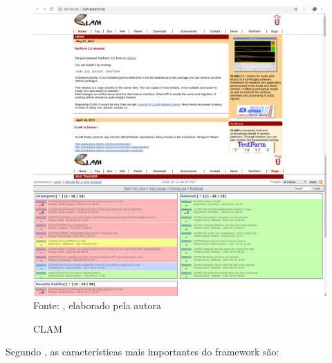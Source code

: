 \begin{figure}[!htb]
   \centering
   \caption{CLAM}\label{fig:clam} 
   \includegraphics[scale=0.25]{figuras/clam.png}
   \\Fonte: \cite{clam}, elaborado pela autora
\end{figure}

Segundo , as características mais importantes do framework são:

